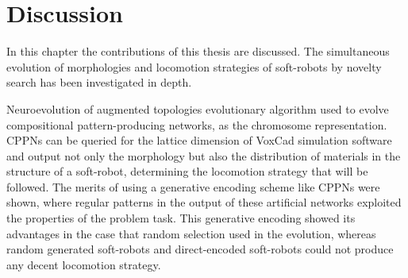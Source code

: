 

\chapter{Discussion} %

\label{Discussion} %


In this chapter the contributions of this thesis are discussed. The simultaneous evolution of morphologies and locomotion strategies of soft-robots by novelty search has been investigated in depth. 

Neuroevolution of augmented topologies evolutionary algorithm used to evolve compositional pattern-producing networks, as the chromosome representation. CPPNs can be queried for the lattice dimension of VoxCad simulation software and output not only the morphology but also the distribution of materials in the structure of a soft-robot, determining the locomotion strategy that will be followed. The merits of using a generative encoding scheme like CPPNs were shown, where regular patterns in the output of these artificial networks exploited the properties of the problem task. This generative encoding showed its advantages in the case that random selection used in the evolution, whereas random generated soft-robots and direct-encoded soft-robots could not produce any decent locomotion strategy. 

